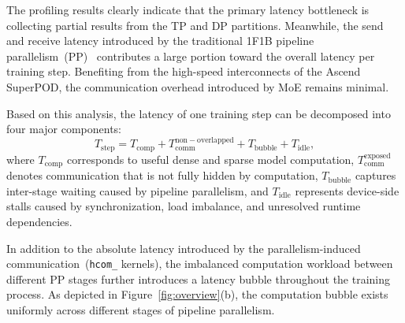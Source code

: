 The profiling results clearly indicate that the primary latency bottleneck is collecting partial results from the TP and DP partitions. Meanwhile, the send and receive latency introduced by the traditional 1F1B pipeline parallelism~(PP)~\citep{narayanan2021efficient} contributes a large portion toward the overall latency per training step. 
Benefiting from the high-speed interconnects of the Ascend SuperPOD, the communication overhead introduced by MoE remains minimal. 


Based on this analysis, the latency of one training step can be decomposed into four major components:
\[
T_{\mathrm{step}} =
T_{\mathrm{comp}} +
T_{\mathrm{comm}}^{\mathrm{non-overlapped}} +
T_{\mathrm{bubble}} +
T_{\mathrm{idle}},
\]
where $T_{\mathrm{comp}}$ corresponds to useful dense and sparse model computation, $T_{\mathrm{comm}}^{\mathrm{exposed}}$ denotes communication that is not fully hidden by computation, $T_{\mathrm{bubble}}$ captures inter-stage waiting caused by pipeline parallelism, and $T_{\mathrm{idle}}$ represents device-side stalls caused by synchronization, load imbalance, and unresolved runtime dependencies.

In addition to the absolute latency introduced by the parallelism-induced communication~(\texttt{hcom\_} kernels), 
the imbalanced computation workload between different PP stages further introduces a latency bubble throughout the training process. 
As depicted in Figure~\ref{fig:overview}(b), the computation bubble exists uniformly across different stages of pipeline parallelism. 

